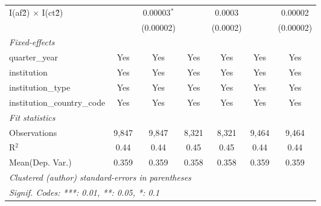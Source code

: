 \begin{tabular}{lcccccc}
   I(af\^2) $\times$ I(ct\^2)         &               & 0.00003$^{*}$  &             & 0.0003         &               & 0.00002\\   
                                      &               & (0.00002)      &             & (0.0002)       &               & (0.00002)\\   
   \midrule
   \emph{Fixed-effects}\\
   quarter\_year                      & Yes           & Yes            & Yes         & Yes            & Yes           & Yes\\  
   institution                        & Yes           & Yes            & Yes         & Yes            & Yes           & Yes\\  
   institution\_type                  & Yes           & Yes            & Yes         & Yes            & Yes           & Yes\\  
   institution\_country\_code         & Yes           & Yes            & Yes         & Yes            & Yes           & Yes\\  
   \midrule
   \emph{Fit statistics}\\
   Observations                       & 9,847         & 9,847          & 8,321       & 8,321          & 9,464         & 9,464\\  
   R$^2$                              & 0.44          & 0.44           & 0.45        & 0.45           & 0.44          & 0.44\\  
Mean(Dep. Var.) & 0.359 & 0.359 & 0.358 & 0.358 & 0.359 & 0.359 \\
   \midrule \midrule
   \multicolumn{7}{l}{\emph{Clustered (author) standard-errors in parentheses}}\\
   \multicolumn{7}{l}{\emph{Signif. Codes: ***: 0.01, **: 0.05, *: 0.1}}\\
\end{tabular}
\par\endgroup
